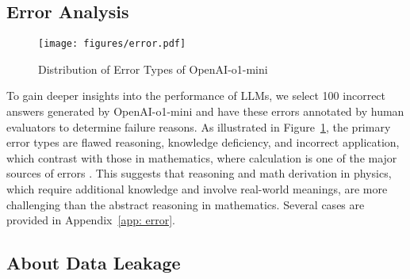 \subsection{Error Analysis}\label{sec: error}

\begin{figure}[t]
    \centering
    \texttt{[image: figures/error.pdf]}
    \caption{Distribution of Error Types of OpenAI-o1-mini}
    \label{fig:error}
\end{figure}

To gain deeper insights into the performance of LLMs, we select 100 incorrect answers generated by OpenAI-o1-mini and have these errors annotated by human evaluators to determine failure reasons.
As illustrated in Figure~\ref{fig:error}, the primary error types are flawed reasoning, knowledge deficiency, and incorrect application, which contrast with those in mathematics, where calculation is one of the major sources of errors \citep{PoT2022Chen,ugmathbench2025xu}.
This suggests that reasoning and math derivation in physics, which require additional knowledge and involve real-world meanings, are more challenging than the abstract reasoning in mathematics.
Several cases are provided in Appendix~\ref{app: error}.





\subsection{About Data Leakage}\label{sec: data_leakage}


